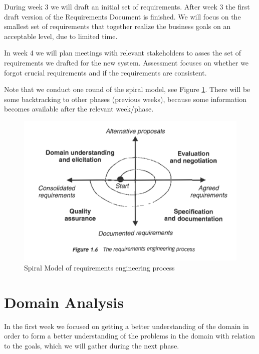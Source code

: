 During week 3 we will draft an initial set of requirements. After week 3 the first draft version of the Requirements Document is finished. We will focus on the smallest set of requirements that together realize the business goals on an acceptable level, due to limited time. 

In week 4 we will plan meetings with relevant stakeholders to asses the set of requirements we drafted for the new system. Assessment focuses on whether we forgot crucial requirements and if the requirements are consistent.  

Note that we conduct one round of the spiral model, see Figure \ref{fig:spiral_model}. There will be some backtracking to other phases (previous weeks), because some information becomes available after the relevant week/phase. 

\begin{figure}[h]
	\centering
	\includegraphics[width=0.75\linewidth]{images/re_process}
	\caption{Spiral Model of requirements engineering process}
	\label{fig:spiral_model}
\end{figure}



\chapter{Domain Analysis}
In the first week we focused on getting a better understanding of the domain in order to form a better understanding of the problems in the domain with relation to the goals, which we will gather during the next phase.

